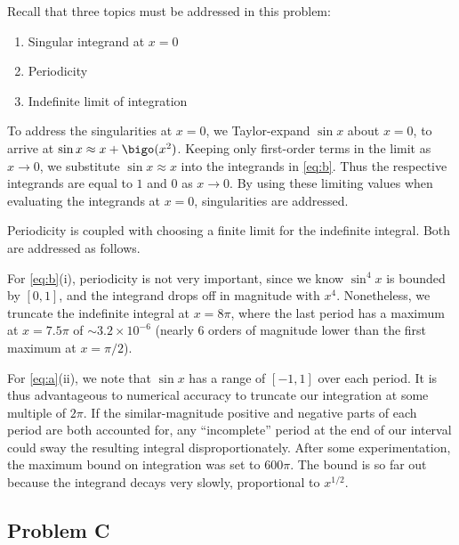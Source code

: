 \documentclass[12pt]{article}
\begin{document}
Recall that three topics must be addressed in this problem:
\begin{enumerate}
\item Singular integrand at $x=0$
\item Periodicity
\item Indefinite limit of integration
\end{enumerate}

To address the singularities at $x=0$, we Taylor-expand $\sin x$ about $x=0$, to arrive at $\sin x \approx x + \bigo(x^2)$. Keeping only first-order terms in the limit as $x \rightarrow 0$, we substitute $\sin x \approx x$ into the integrands in \eqref{eq:b}. Thus the respective integrands are equal to $1$ and $0$ as $x \rightarrow 0$. By using these limiting values when evaluating the integrands at $x=0$, singularities are addressed.

Periodicity is coupled with choosing a finite limit for the indefinite integral. Both are addressed as follows.

For \eqref{eq:b}(i), periodicity is not very important, since we know $\sin^4 x$ is bounded by $[0,1]$, and the integrand drops off in magnitude with $x^4$. Nonetheless, we truncate the indefinite integral at $x=8\pi$, where the last period has a maximum at $x = 7.5 \pi$ of $\sim 3.2 \times 10^{-6}$ (nearly 6 orders of magnitude lower than the first maximum at $x=\pi/2$).

For \eqref{eq:a}(ii), we note that $\sin x$ has a range of $[-1,1]$ over each period. It is thus advantageous to numerical accuracy to truncate our integration at some multiple of $2\pi$. If the similar-magnitude positive and negative parts of each period are both accounted for, any ``incomplete'' period at the end of our interval could sway the resulting integral disproportionately. After some experimentation, the maximum bound on integration was set to $600 \pi$. The bound is so far out because the integrand decays very slowly, proportional to $x^{1/2}$.

\subsection{Problem C}
\end{document}
